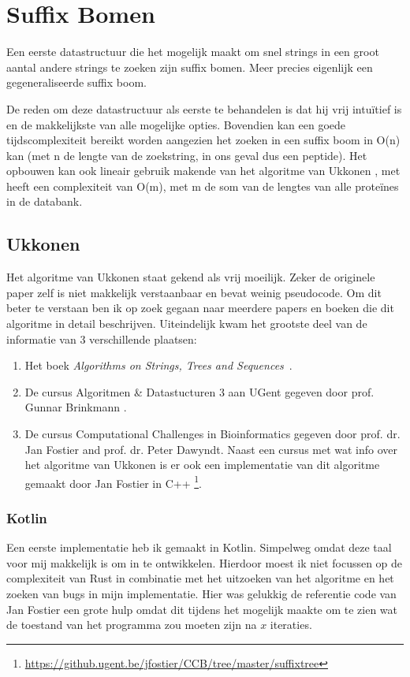 \chapter{Suffix Bomen}\label{ch:suffix-bomen}
Een eerste datastructuur die het mogelijk maakt om snel strings in een groot aantal andere strings te zoeken zijn suffix bomen.
Meer precies eigenlijk een gegeneraliseerde suffix boom.

De reden om deze datastructuur als eerste te behandelen is dat hij vrij intuïtief is en de makkelijkste van alle mogelijke opties.
Bovendien kan een goede tijdscomplexiteit bereikt worden aangezien het zoeken in een suffix boom in O(n) kan (met n de lengte van de zoekstring, in ons geval dus een peptide).
Het opbouwen kan ook lineair gebruik makende van het algoritme van Ukkonen \cite{Ukkonen1995}, met heeft een complexiteit van O(m), met m de som van de lengtes van alle proteïnes in de databank.

\section{Ukkonen}\label{sec:Ukkonen}
Het algoritme van Ukkonen staat gekend als vrij moeilijk.
Zeker de originele paper zelf is niet makkelijk verstaanbaar en bevat weinig pseudocode.
Om dit beter te verstaan ben ik op zoek gegaan naar meerdere papers en boeken die dit algoritme in detail beschrijven.
Uiteindelijk kwam het grootste deel van de informatie van 3 verschillende plaatsen:
\begin{enumerate}
    \item Het boek \textit{Algorithms on Strings, Trees and Sequences}~\cite{Gusfield1997}.
    \item De cursus Algoritmen \& Datastucturen 3 aan UGent gegeven door prof. Gunnar Brinkmann \cite{AD3_ukkonen}.
    \item De cursus Computational Challenges in Bioinformatics gegeven door prof. dr. Jan Fostier and prof. dr. Peter Dawyndt.
    Naast een cursus met wat info over het algoritme van Ukkonen is er ook een implementatie van dit algoritme gemaakt door Jan Fostier in C++ \footnote{\url{https://github.ugent.be/jfostier/CCB/tree/master/suffixtree}}.
\end{enumerate}

\subsection{Kotlin}\label{subsec:kotlin}
Een eerste implementatie heb ik gemaakt in Kotlin.
Simpelweg omdat deze taal voor mij makkelijk is om in te ontwikkelen.
Hierdoor moest ik niet focussen op de complexiteit van Rust in combinatie met het uitzoeken van het algoritme en het zoeken van bugs in mijn implementatie.
Hier was gelukkig de referentie code van Jan Fostier een grote hulp omdat dit tijdens het mogelijk maakte om te zien wat de toestand van het programma zou moeten zijn na $x$ iteraties.

